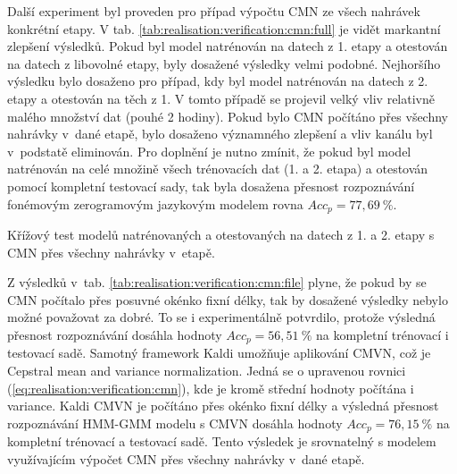 Další experiment byl proveden pro případ výpočtu CMN ze všech nahrávek konkrétní etapy.
V tab. \ref{tab:realisation:verification:cmn:full} je vidět markantní zlepšení výsledků.
Pokud byl model natrénován na datech z 1. etapy a otestován na datech z libovolné etapy, byly dosažené výsledky velmi podobné.
Nejhoršího výsledku bylo dosaženo pro případ, kdy byl model natrénován na datech z 2. etapy a otestován na těch z 1.
V tomto případě se projevil velký vliv relativně malého množství dat (pouhé 2 hodiny).
Pokud bylo CMN počítáno přes všechny nahrávky v~dané etapě, bylo dosaženo významného zlepšení a vliv kanálu byl v~podstatě eliminován.
Pro doplnění je nutno zmínit, že pokud byl model natrénován na celé množině všech trénovacích dat (1. a 2. etapa) a otestován pomocí kompletní testovací sady, tak byla dosažena přesnost rozpoznávání fonémovým zerogramovým jazykovým modelem rovna $Acc_{p} = 77,69\ \%$.


\begin{table}[htpb]
  \centering
  \def\arraystretch{1.5}
  \caption[Křížový test s CMN přes všechny nahrávky]{Křížový test modelů natrénovaných a otestovaných na datech z 1. a 2. etapy s CMN  přes všechny nahrávky v~etapě.}
  \label{tab:realisation:verification:cmn:full}
\end{table}

Z výsledků v~tab. \ref{tab:realisation:verification:cmn:file} plyne, že pokud by se CMN počítalo přes posuvné okénko fixní délky, tak by dosažené výsledky nebylo možné považovat za dobré.
To se i experimentálně potvrdilo, protože výsledná přesnost rozpoznávání dosáhla hodnoty $Acc_{p} = 56,51\ \%$ na kompletní trénovací i testovací sadě.
Samotný framework Kaldi umožňuje aplikování CMVN, což je Cepstral mean and variance normalization.
Jedná se o upravenou rovnici (\ref{eq:realisation:verification:cmn}), kde je kromě střední hodnoty počítána i variance.
Kaldi CMVN je počítáno přes okénko fixní délky a výsledná přesnost rozpoznávání HMM-GMM modelu s CMVN dosáhla hodnoty $Acc_{p} = 76,15\ \%$ na kompletní trénovací a testovací sadě.
Tento výsledek je srovnatelný s modelem využívajícím výpočet CMN přes všechny nahrávky v~dané etapě.

